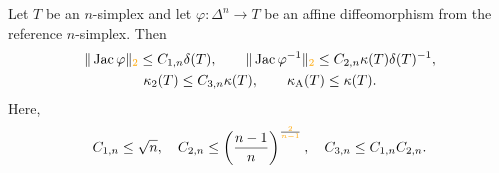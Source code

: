 \documentclass[10pt,letterpaper]{article}
\newcommand\cye[1]{%
  \protect\leavevmode
  \begingroup
    \color{red!35!yellow}%
    #1%
  \endgroup
}
\begin{document}
\begin{lemma}\label{lemma:measurerelationships}
    Let $T$ be an $n$-simplex and let $\varphi : \Delta^{n} \rightarrow T$ be an affine diffeomorphism from the reference $n$-simplex. Then 
    \begin{gather*}
        \| \Jacobian \varphi \|_{\cye{2}}
        \leq 
        \Ceins{n} \diam(T) %
        ,
        \qquad 
        \| \Jacobian \varphi^{-1} \|_{\cye{2}}
        \leq 
        \Czwei{n} 
        \kappa(T) 
        \diam(T)^{-1}
        ,
        \\
        \kappa_{2}(T)
        \leq 
        \Cdrei{n}
        \kappa(T)
        ,
        \qquad 
        \kappa_{\maxcol}(T)
        \leq 
        \kappa(T)
        .
    \end{gather*}
    Here,
    \begin{align*}
        \Ceins{n} \leq \sqrt{n},
        \quad 
        \Czwei{n} \leq          \left( \frac{n-1}{n} \right)^{\frac{\cye{2}}{\cye{n-1}}}, 
        \quad 
        \Cdrei{n} \leq \Ceins{n}\Czwei{n} %
        . 
    \end{align*}
\end{lemma}
\end{document}
